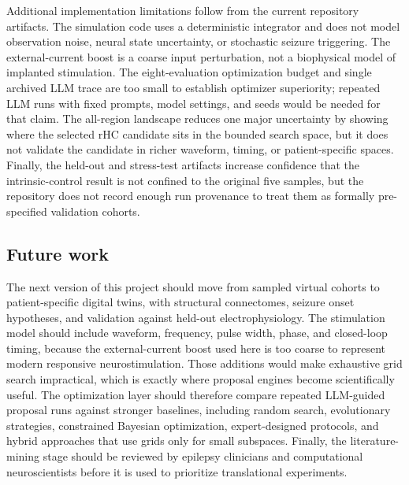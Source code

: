 \documentclass{article}
\begin{document}
Additional implementation limitations follow from the current repository artifacts. The simulation code uses a deterministic integrator and does not model observation noise, neural state uncertainty, or stochastic seizure triggering. The external-current boost is a coarse input perturbation, not a biophysical model of implanted stimulation. The eight-evaluation optimization budget and single archived LLM trace are too small to establish optimizer superiority; repeated LLM runs with fixed prompts, model settings, and seeds would be needed for that claim. The all-region landscape reduces one major uncertainty by showing where the selected rHC candidate sits in the bounded search space, but it does not validate the candidate in richer waveform, timing, or patient-specific spaces. Finally, the held-out and stress-test artifacts increase confidence that the intrinsic-control result is not confined to the original five samples, but the repository does not record enough run provenance to treat them as formally pre-specified validation cohorts.

\subsection{Future work}
The next version of this project should move from sampled virtual cohorts to patient-specific digital twins, with structural connectomes, seizure onset hypotheses, and validation against held-out electrophysiology. The stimulation model should include waveform, frequency, pulse width, phase, and closed-loop timing, because the external-current boost used here is too coarse to represent modern responsive neurostimulation. Those additions would make exhaustive grid search impractical, which is exactly where proposal engines become scientifically useful. The optimization layer should therefore compare repeated LLM-guided proposal runs against stronger baselines, including random search, evolutionary strategies, constrained Bayesian optimization, expert-designed protocols, and hybrid approaches that use grids only for small subspaces. Finally, the literature-mining stage should be reviewed by epilepsy clinicians and computational neuroscientists before it is used to prioritize translational experiments.
\end{document}
